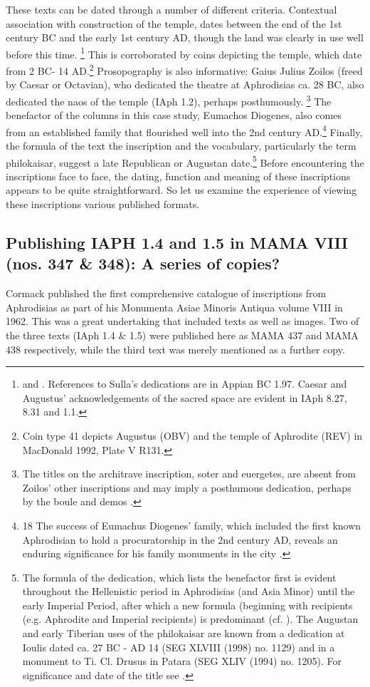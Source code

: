 \documentclass[amsthm,ebook]{saparticle}
\begin{document}
These texts can be dated through a number of different criteria. Contextual association with construction of the
temple, dates between the end of the 1st century BC and the early 1st century AD, though the land was clearly in use
well before this time. \footnote{\citet[41-42]{smith1996} and \citet[37]{reynolds1990}. References to Sulla’s dedications are in
Appian BC 1.97. Caesar and Augustus’ acknowledgements of the sacred space are evident in IAph 8.27, 8.31 and 1.1. }
This is corroborated by coins depicting the temple, which date from 2 BC- 14 AD.\footnote{ Coin type 41 depicts
Augustus (OBV) and the temple of Aphrodite (REV) in MacDonald 1992, Plate V R131. } Prosopography is also informative:
Gaius Julius Zoilos (freed by Caesar or Octavian), who dedicated the theatre at Aphrodisias ca. 28 BC, also dedicated
the naos of the temple (IAph 1.2), perhaps posthumously. \footnote{ The titles on the architrave inscription, soter and
euergetes, are absent from Zoilos’ other inscriptions and may imply a posthumous dedication, perhaps by the boule and
demos \citep[38]{reynolds 1990}.} The benefactor of the columns in this case study, Eumachos Diogenes, also comes from an
established family that flourished well into the 2nd century AD.\footnote{18 The success of Eumachus Diogenes’ family,
which included the first known Aphrodisian to hold a procuratorship in the 2nd century AD, reveals an enduring
significance for his family monuments in the city \citep[327-334]{reynolds1999}.} Finally, the formula of the text the
inscription and the vocabulary, particularly the term philokaisar, suggest a late Republican or Augustan
date.\footnote{ The formula of the dedication, which lists the benefactor first is evident throughout the Hellenistic
period in Aphrodisias (and Asia Minor) until the early Imperial Period, after which a new formula (beginning with
recipients (e.g. Aphrodite and Imperial recipients) is predominant (cf. \citet[4-7]{graham2013}). The Augustan and early
Tiberian uses of the philokaisar are known from a dedication at Ioulis dated ca. 27 BC - AD 14 (SEG XLVIII (1998) no.
1129) and in a monument to Ti. Cl. Drusus in Patara (SEG XLIV (1994) no. 1205). For significance and date of the title
see \citet[101-105]{buraselis2001}.} Before encountering the inscriptions face to face, the dating, function and meaning of
these inscriptions appears to be quite straightforward. So let us examine the experience of viewing these
inscriptions various published formats.




\subsection{Publishing IAPH 1.4 and 1.5 in MAMA VIII (nos. 347 \& 348): A series of copies?}
\noindent Cormack published the first comprehensive catalogue of inscriptions from Aphrodisias as part of his Monumenta Asiae
Minoris Antiqua volume VIII in 1962. This was a great undertaking that included texts as well as images. Two of the
three texts (IAph 1.4 \& 1.5) were published here as MAMA 437 and MAMA 438 respectively, while the third text was
merely mentioned as a further copy. 
\end{document}

